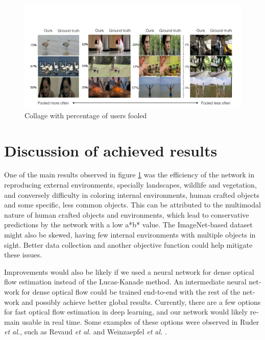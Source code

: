\documentclass[12pt,openright,oneside,a4paper,english]{abntex2}
\begin{document}
\begin{otherlanguage}{english}
    \begin{figure}[H]
    \centering
    \includegraphics[width=\textwidth+20pt]{fool_collage}
    \caption{Collage with percentage of users fooled}
    \label{fig:fool_collage}
    \end{figure}

    \chapter{Discussion of achieved results}
    One of the main results observed in figure \ref{fig:fool_collage} was the efficiency of the network in reproducing external environments, specially landscapes, wildlife and vegetation, and conversely difficulty in coloring internal environments, human crafted objects and some specific, less common objects. This can be attributed to the multimodal nature of human crafted objects and environments, which lead to conservative predictions by the network with a low a*b* value.  The ImageNet-based dataset might also be skewed, having few internal environments with multiple objects in sight. Better data collection and another objective function could help mitigate these issues.

    Improvements would also be likely if we used a neural network for dense optical flow estimation instead of the Lucas-Kanade method. An intermediate neural network for dense optical flow could be trained end-to-end with the rest of the network and possibly achieve better global results. Currently, there are a few options for fast optical flow estimation in deep learning, and our network would likely remain usable in real time. Some examples of these options were observed in Ruder \textit{et al.}\cite{Ruder2016}, such as Revaud \textit{et al.} \cite{epicflow} and Weinzaepfel \textit{et al.} \cite{deepflow}.





\end{otherlanguage}
\end{document}
